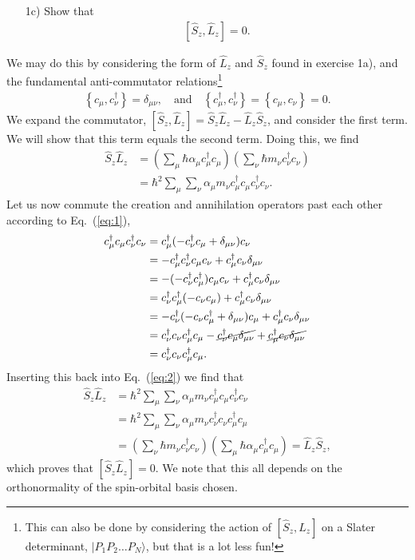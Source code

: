 \documentclass[a4paper]{article}
\newcommand{\eq} [1]{Eq.\ (\ref{eq:#1})}
\newcommand{\nn}{\nonumber}
\renewcommand{\L}{\hat{L}_z}
\renewcommand{\S}{\hat{S}_z}
\newcommand{\slater}{|P_1P_2\dots P_N\rangle}
\newcommand{\cm}{c_\mu}
\newcommand{\cn}{c_\nu}
\newcommand{\cmd}{c_\mu^\dagger}
\newcommand{\cnd}{c_\nu^\dagger}
\begin{document}
\begin{exframe}
\begin{itemize}
  \item[1c)] Show that 
  \begin{align}
  \left[\S,\L \right] = 0.
  \end{align}
\end{itemize}
\end{exframe}
We may do this by considering the form of $\L$ and $\S$ found in exercise 1a), and the fundamental anti-commutator relations\footnote{This can also be done by considering the action of $[\S,\L]$ on a Slater determinant, $\slater$, but that is a lot less fun!}
\begin{align}
\left\{c_\mu, c_\nu^\dagger\right\} = \delta_{\mu \nu}, \ \ \ \text{ and } \ \ \ \left\{c_\mu^\dagger, c_\nu^\dagger\right\} = \left\{c_\mu, c_\nu\right\} = 0. \label{eq:1}
\end{align}
We expand the commutator, $[\S,\L]=\S\L-\L\S$, and consider the first term. We will show that this term equals the second term. Doing this, we find
\begin{align}
\S\L  &= \left(\sum_{\mu}\hbar\alpha_\mu c_\mu^\dagger c_\mu \right)\left(\sum_{\nu}\hbar m_\nu c_\nu^\dagger c_\nu \right) \nn\\
      &= \hbar^2 \sum_\mu \sum_\nu \alpha_\mu m_\nu   c_\mu^\dagger c_\mu c_\nu^\dagger c_\nu. \label{eq:2}
\end{align}
Let us now commute the creation and annihilation operators past each other according to \eq{1},
\begin{align}
c_\mu^\dagger c_\mu c_\nu^\dagger c_\nu &= \cmd (-\cnd\cm+\delta_{\mu\nu}) \cn \nn\\
                                        &= - \cmd \cnd \cm \cn + \cmd \cn \delta_{\mu\nu} \nn\\
                                        &= - (-\cnd\cmd) \cm \cn + \cmd \cn \delta_{\mu\nu} \nn\\
                                        &= \cnd\cmd (-\cn\cm) + \cmd \cn \delta_{\mu\nu} \nn\\
                                        &= -\cnd(-\cn\cmd+\delta_{\mu\nu})\cm + \cmd \cn \delta_{\mu\nu} \nn\\
                                        &= \cnd\cn\cmd\cm - \cancel{\cnd\cm\delta_{\mu\nu}} + \cancel{\cmd \cn \delta_{\mu\nu}} \nn\\
                                        &= \cnd\cn\cmd\cm.
\end{align}
Inserting this back into \eq{2} we find that 
\begin{align}
\S\L  &= \hbar^2 \sum_\mu \sum_\nu \alpha_\mu m_\nu   c_\mu^\dagger c_\mu c_\nu^\dagger c_\nu \nn\\
      &= \hbar^2 \sum_\mu \sum_\nu \alpha_\mu m_\nu  \cnd\cn\cmd\cm  \nn\\
      &= \left(\sum_\nu \hbar m_\nu \cnd\cn \right) \left(\sum_\mu \hbar\alpha_\mu \cmd\cm \right)= \L\S,
\end{align}
which proves that $[\S\L]=0$. We note that this all depends on the orthonormality of the spin-orbital basis chosen.
\end{document}
